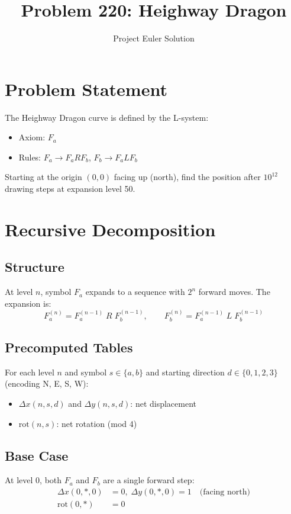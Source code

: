 \documentclass[12pt]{article}
\title{Problem 220: Heighway Dragon}
\author{Project Euler Solution}
\date{}
\begin{document}
\maketitle

\section{Problem Statement}
The Heighway Dragon curve is defined by the L-system:
\begin{itemize}
    \item Axiom: $F_a$
    \item Rules: $F_a \to F_a R F_b$, $F_b \to F_a L F_b$
\end{itemize}
Starting at the origin $(0, 0)$ facing up (north), find the position after $10^{12}$ drawing steps at expansion level 50.

\section{Recursive Decomposition}

\subsection{Structure}
At level $n$, symbol $F_a$ expands to a sequence with $2^n$ forward moves. The expansion is:
\[
F_a^{(n)} = F_a^{(n-1)} \; R \; F_b^{(n-1)}, \qquad F_b^{(n)} = F_a^{(n-1)} \; L \; F_b^{(n-1)}
\]

\subsection{Precomputed Tables}
For each level $n$ and symbol $s \in \{a, b\}$ and starting direction $d \in \{0,1,2,3\}$ (encoding N, E, S, W):

\begin{itemize}
    \item $\Delta x(n, s, d)$ and $\Delta y(n, s, d)$: net displacement
    \item $\text{rot}(n, s)$: net rotation (mod 4)
\end{itemize}

\subsection{Base Case}
At level 0, both $F_a$ and $F_b$ are a single forward step:
\begin{align}
\Delta x(0, *, 0) &= 0, \; \Delta y(0, *, 0) = 1 \quad \text{(facing north)} \\
\text{rot}(0, *) &= 0
\end{align}
\end{document}
